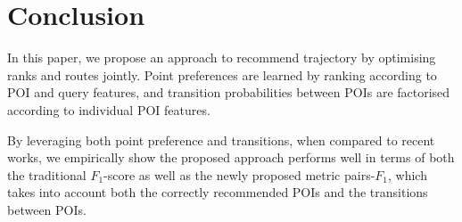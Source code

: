 \section{Conclusion}
\label{sec:conclusion}


In this paper, we propose an approach to recommend trajectory by optimising ranks and routes jointly.
Point preferences are learned by ranking according to POI and query features, 
and transition probabilities between POIs are factorised according to individual POI features.

By leveraging both point preference and transitions, when compared to recent works,
we empirically show the proposed approach performs well in terms of both the traditional $F_1$-score
as well as the newly proposed metric pairs-$F_1$, which takes into account both the correctly recommended POIs 
and the transitions between POIs.


